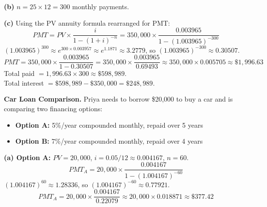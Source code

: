 \documentclass[addpoints]{exam}
\begin{document}
\begin{questions}
\begin{solution}
\textbf{(b)} $n = 25 \times 12 = 300$ monthly payments.

\textbf{(c)} Using the PV annuity formula rearranged for PMT:
\[
PMT = PV \times \frac{i}{1-(1+i)^{-n}}
    = 350{,}000 \times \frac{0.003965}{1-(1.003965)^{-300}}
\]
$(1.003965)^{300} \approx e^{300 \times 0.003957} \approx e^{1.1871} \approx 3.2779$, so $(1.003965)^{-300} \approx 0.30507$.
\[
PMT = 350{,}000 \times \frac{0.003965}{1 - 0.30507}
    = 350{,}000 \times \frac{0.003965}{0.69493}
    \approx 350{,}000 \times 0.005705
    \approx \$1{,}996.63
\]
Total paid $= 1{,}996.63 \times 300 \approx \$598{,}989$.\\
Total interest $= \$598{,}989 - \$350{,}000 = \$248{,}989$.
\end{solution}

\vspace{5mm}

\question[8]
\textbf{Car Loan Comparison.}
Priya needs to borrow \$20{,}000 to buy a car and is comparing two financing options:
\begin{itemize}
    \item \textbf{Option A:} 5\%/year compounded monthly, repaid over 5 years
    \item \textbf{Option B:} 7\%/year compounded monthly, repaid over 4 years
\end{itemize}


\begin{solution}
\textbf{(a) Option A:} $PV = 20{,}000$, $i = 0.05/12 \approx 0.004167$, $n = 60$.
\[
PMT_A = 20{,}000 \times \frac{0.004167}{1-(1.004167)^{-60}}
\]
$(1.004167)^{60} \approx 1.28336$, so $(1.004167)^{-60} \approx 0.77921$.
\[
PMT_A = 20{,}000 \times \frac{0.004167}{0.22079} \approx 20{,}000 \times 0.018871 \approx \$377.42
\]


\end{solution}
\end{questions}
\end{document}
